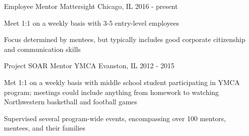 

\begin{cventries}

  \cventry
    {Employee Mentor} %
    {Mattersight} %
    {Chicago, IL} %
    {2016 - present} %
    {
      \begin{cvitems} %
        \item {Meet 1:1 on a weekly basis with 3-5 entry-level employees}
        \item {Focus determined by mentees, but typically includes good corporate citizenship and communication skills}
      \end{cvitems}
    }

  \cventry
    {Project SOAR Mentor} %
    {YMCA} %
    {Evanston, IL} %
    {2012 - 2015} %
    {
      \begin{cvitems} %
        \item {Met 1:1 on a weekly basis with middle school student participating in YMCA program; meetings could include anything from homework to watching Northwestern basketball and football games}
        \item {Supervised several program-wide events, encompassing  over 100 mentors, mentees, and their families}
      \end{cvitems}
    }

\end{cventries}
